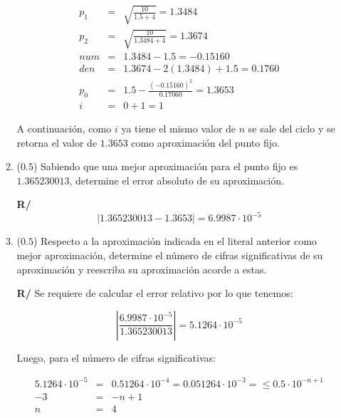 \documentclass[12pt]{article}
\begin{document}
\begin{enumerate}[leftmargin=*,widest=9]
\begin{enumerate}[label=\alph*]
\begin{eqnarray*}
p_1 &=& \sqrt{\frac{10}{1.5 + 4}} = 1.3484 \\
p_2 &=& \sqrt{\frac{10}{1.3484 + 4}} = 1.3674 \\
num &=& 1.3484 - 1.5 = -0.15160\\
den &=& 1.3674 - 2(1.3484) + 1.5 = 0.1760\\
p_0 &=& 1.5 - \frac{{(-0.15160)}^2}{0.17060} = 1.3653\\
i &=& 0 + 1 = 1
\end{eqnarray*}

A continuación, como \(i\) ya tiene el mismo valor de \(n\) se sale del ciclo y se retorna el valor de %
\(1.3653\)
como aproximación del punto fijo.

    \item (\(0.5\)) Sabiendo que una mejor aproximación para el punto fijo es \(1.365230013\), determine el error absoluto de su aproximación.

    \textbf{R/} %
    \[\vert 1.365230013 -  1.3653 \vert = 6.9987\cdot 10^{-5} \]

    \item (\(0.5\)) Respecto a la aproximación indicada en el literal anterior como mejor aproximación, determine el número de cifras significativas de su aproximación y reescriba su aproximación acorde a estas.

\textbf{R/} Se requiere de calcular el error relativo por lo que tenemos:

    \[ \left \vert \frac{6.9987\cdot 10^{-5}}{1.365230013} \right\vert = 5.1264\cdot 10^{-5}\]

Luego, para el número de cifras significativas:

%

\begin{eqnarray*}
5.1264\cdot 10^{-5} &=& 0.51264\cdot 10^{-4} = 0.051264\cdot 10^{-3} = \leq 0.5 \cdot 10^{-n + 1}\\
-3 &=& - n + 1\\
n &=& 4
\end{eqnarray*}


\end{enumerate}
\end{enumerate}
\end{document}
